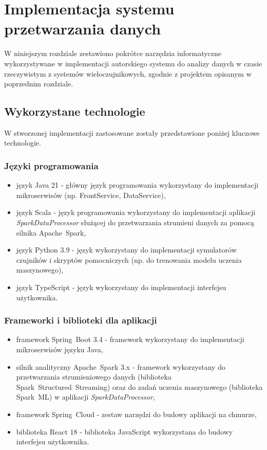 \section{Implementacja systemu przetwarzania danych}
\label{sec:implementacja_systemu}

W niniejszym rozdziale zestawiono pokrótce narzędzia informatyczne wykorzystywane w implementacji autorskiego systemu do analizy danych w czasie rzeczywistym z systemów wieloczujnikowych,
zgodnie z projektem opisanym w poprzednim rozdziale.

\subsection{Wykorzystane technologie}
\label{subsec:technologie}

W stworzonej implementacji zastosowane zostały przedstawione poniżej kluczowe technologie.

\subsubsection{Języki programowania}
\label{subsubsec:jezyki_programowania}

\begin{itemize}
    \item język Java 21 - główny język programowania wykorzystany do implementacji mikroserwisów (np. FrontService, DataService),
    \item język Scala - język programowania wykorzystany do implementacji aplikacji \\ \textit{\mbox{SparkDataProcessor}} służącej do przetwarzania strumieni danych za pomocą silnika \mbox{Apache Spark},
    \item język Python 3.9 - język wykorzystany do implementacji symulatorów czujników i skryptów pomocniczych (np. do trenowania modelu uczenia maszynowego),
    \item język TypeScript - język wykorzystany do implementacji interfejsu użytkownika.
\end{itemize}

\subsubsection{Frameworki i biblioteki dla aplikacji}
\label{subsubsec:frameworki}

\begin{itemize}
    \item framework \mbox{Spring Boot} 3.4 - framework wykorzystany do implementacji mikroserwisów języku Java,
    \item silnik analityczny \mbox{Apache Spark} 3.x \cite{spark_streaming} - framework wykorzystany do przetwarzania strumieniowego danych (biblioteka \mbox{Spark Structured Streaming}) \cite{chambers2018spark} oraz do zadań uczenia maszynowego (biblioteka \mbox{Spark ML}) w aplikacji \mbox{\textit{SparkDataProcessor}},
    \item framework \mbox{Spring Cloud} - zestaw narzędzi do budowy aplikacji na chmurze,
    \item biblioteka React 18 - biblioteka JavaScript wykorzystana do budowy interfejsu użytkownika.
\end{itemize}

